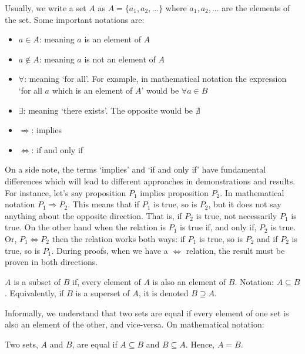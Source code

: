 Usually, we write a set $A$ as $A = \{ a_1, a_2, ...\}$ where $a_1, a_2, ...$ are the elements of the set. Some important notations are:

\begin{itemize}
    \item $a \in A$: meaning $a$ is an element of $A$
    \item $a \notin A$: meaning $a$ is not an element of $A$
    \item $\forall$: meaning `for all'. For example, in mathematical notation the expression `for all $a$ which is an element of $A$' would be $\forall a \in B$
    \item $\exists$: meaning `there exists'. The opposite would be $\nexists$
    \item $\Rightarrow$: implies
    \item $\Leftrightarrow$: if and only if
\end{itemize}

On a side note, the terms `implies' and `if and only if' have fundamental differences which will lead to different approaches in demonstrations and results. For instance, let's say proposition $P_1$ implies proposition $P_2$. In mathematical notation $P_1 \Rightarrow P_2$. This means that if $P_1$ is true, so is  $P_2$, but it does not say anything about the opposite direction. That is, if $P_2$ is true, not necessarily $P_1$ is true. On the other hand when the relation is $P_1$ is true if, and only if, $P_2$ is true. Or, $P_1 \Leftrightarrow P_2$ then the relation works both ways: if $P_1$ is true, so is $P_2$ and if $P_2$ is true, so is $P_1$. During proofs, when we have a $\Leftrightarrow$ relation, the result must be proven in both directions.

\begin{definition}[Subset]
    $A$ is a subset of $B$ if, every element of $A$ is also an element of $B$. Notation: $A \subseteq B$. Equivalently, if $B$ is a superset of $A$, it is denoted $B \supseteq A$.
\end{definition}

Informally, we understand that two sets are equal if every element of one set is also an element of the other, and vice-versa. On mathematical notation:

\begin{definition}
    Two sets, $A$ and $B$, are equal if $A \subseteq B$ and $B \subseteq A$. Hence, $A = B$.
\end{definition}

